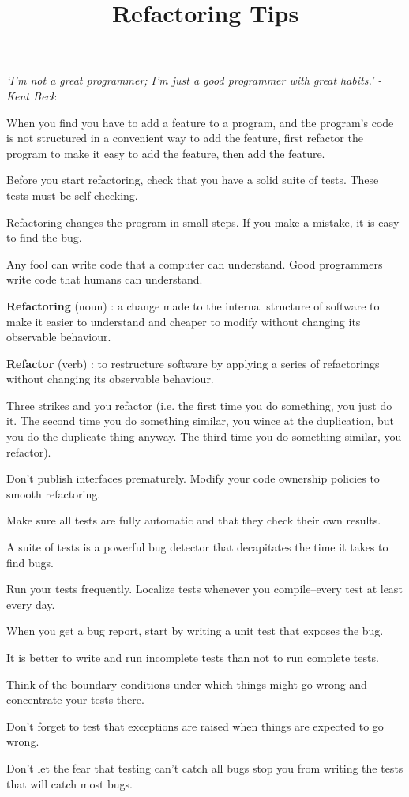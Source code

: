 \documentclass{article}
\newcommand{\np}{\par\noindent}
\begin{document}
\title{Refactoring Tips}
\date{}
\maketitle

\vspace{-2cm}
\begin{center}
\textit{`I'm not a great programmer; I'm just a good programmer with great habits.' - Kent Beck}\\
\end{center}

\np When you find you have to add a feature to a program, and the program's code is not structured in a convenient way to add the feature, first refactor the program to make it easy to add the feature, then add the feature.
\np Before you start refactoring, check that you have a solid suite of tests. These tests must be self-checking.
\np Refactoring changes the program in small steps. If you make a mistake, it is easy to find the bug.
\np Any fool can write code that a computer can understand. Good programmers write code that humans can understand.
\np \textbf{Refactoring} (noun) : a change made to the internal structure of software to make it easier to understand and cheaper to modify without changing its observable behaviour.
\np \textbf{Refactor} (verb) : to restructure software by applying a series of refactorings without changing its observable behaviour.
\np Three strikes and you refactor (i.e. the first time you do something, you just do it. The second time you do something similar, you wince at the duplication, but you do the duplicate thing anyway. The third time you do something similar, you refactor).
\np Don't publish interfaces prematurely. Modify your code ownership policies to smooth refactoring.
\np Make sure all tests are fully automatic and that they check their own results.
\np A suite of tests is a powerful bug detector that decapitates the time it takes to find bugs.
\np Run your tests frequently. Localize tests whenever you compile--every test at least every day.
\np When you get a bug report, start by writing a unit test that exposes the bug.
\np It is better to write and run incomplete tests than not to run complete tests.
\np Think of the boundary conditions under which things might go wrong and concentrate your tests there.
\np Don't forget to test that exceptions are raised when things are expected to go wrong.
\np Don't let the fear that testing can't catch all bugs stop you from writing the tests that will catch most bugs.
\end{document}

